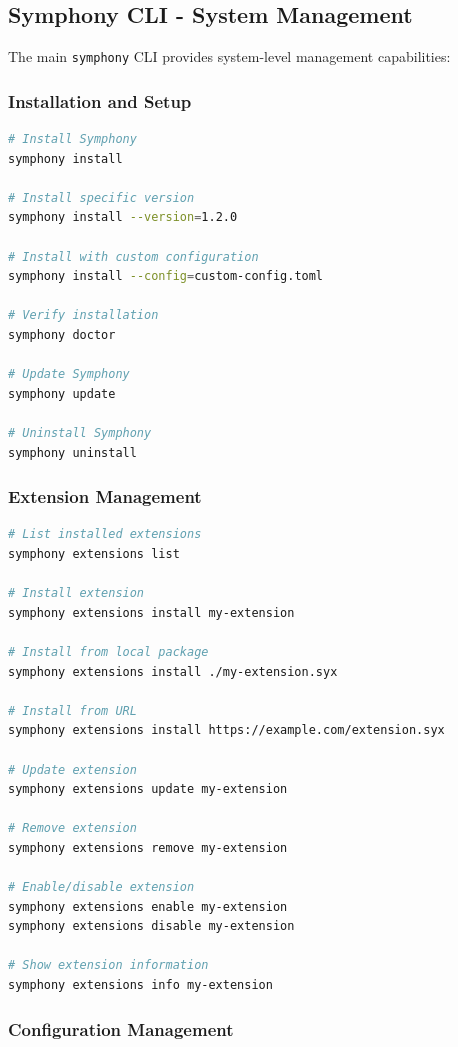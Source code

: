 \subsection*{Symphony CLI - System Management}

The main \texttt{symphony} CLI provides system-level management capabilities:

\subsubsection*{Installation and Setup}

\begin{lstlisting}[language=bash,caption={System Installation}]
# Install Symphony
symphony install

# Install specific version
symphony install --version=1.2.0

# Install with custom configuration
symphony install --config=custom-config.toml

# Verify installation
symphony doctor

# Update Symphony
symphony update

# Uninstall Symphony
symphony uninstall
\end{lstlisting}

\subsubsection*{Extension Management}

\begin{lstlisting}[language=bash,caption={Extension Management}]
# List installed extensions
symphony extensions list

# Install extension
symphony extensions install my-extension

# Install from local package
symphony extensions install ./my-extension.syx

# Install from URL
symphony extensions install https://example.com/extension.syx

# Update extension
symphony extensions update my-extension

# Remove extension
symphony extensions remove my-extension

# Enable/disable extension
symphony extensions enable my-extension
symphony extensions disable my-extension

# Show extension information
symphony extensions info my-extension
\end{lstlisting}

\subsubsection*{Configuration Management}

